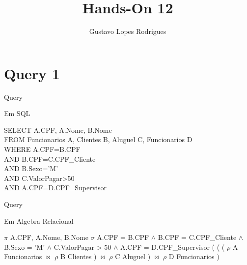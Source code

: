 \documentclass[aspectratio=169]{beamer}
\title{Hands-On 12}
\author{Gustavo Lopes Rodrigues}
\begin{document}
    \begin{frame}

    \titlepage

    \end{frame}



    \section{Query 1}

    \begin{frame}{Query}
     
      Em SQL

      \begin{flushleft}
          SELECT A.CPF, A.Nome, B.Nome \\
          FROM Funcionarios A, Clientes B, Aluguel C, Funcionarios D \\
          WHERE A.CPF=B.CPF \\
          AND B.CPF=C.CPF\_Cliente \\
          AND B.Sexo='M' \\
          AND C.ValorPagar>50 \\
          AND A.CPF=D.CPF\_Supervisor \\
      \end{flushleft}

    \end{frame}

    \begin{frame}{Query}
  
      Em Algebra Relacional
      \begin{flushleft}
        $\pi$ A.CPF, A.Nome, B.Nome $\sigma$ A.CPF = B.CPF $\wedge$ B.CPF = C.CPF\_Cliente $\wedge$ B.Sexo = 'M' $\wedge$ C.ValorPagar > 50 $\wedge$ A.CPF = D.CPF\_Supervisor ( ( ( $\rho$ A Funcionarios $\bowtie$ $\rho$ B Clientes ) $\bowtie$ $\rho$ C Aluguel ) $\bowtie$ $\rho$ D Funcionarios ) 
      \end{flushleft}
    \end{frame}
\end{document}
